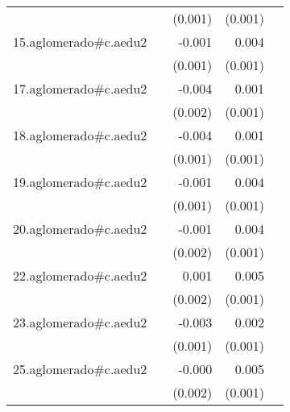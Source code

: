 {\begin{longtable}{l*{4}{D{.}{.}{-1}}}
            &                     &     (0.001)         &     (0.001)         &                     \\
\addlinespace
15.aglomerado#c.aedu2&                     &      -0.001         &       0.004\sym{***}&                     \\
            &                     &     (0.001)         &     (0.001)         &                     \\
\addlinespace
17.aglomerado#c.aedu2&                     &      -0.004\sym{**} &       0.001         &                     \\
            &                     &     (0.002)         &     (0.001)         &                     \\
\addlinespace
18.aglomerado#c.aedu2&                     &      -0.004\sym{**} &       0.001         &                     \\
            &                     &     (0.001)         &     (0.001)         &                     \\
\addlinespace
19.aglomerado#c.aedu2&                     &      -0.001         &       0.004\sym{***}&                     \\
            &                     &     (0.001)         &     (0.001)         &                     \\
\addlinespace
20.aglomerado#c.aedu2&                     &      -0.001         &       0.004\sym{**} &                     \\
            &                     &     (0.002)         &     (0.001)         &                     \\
\addlinespace
22.aglomerado#c.aedu2&                     &       0.001         &       0.005\sym{***}&                     \\
            &                     &     (0.002)         &     (0.001)         &                     \\
\addlinespace
23.aglomerado#c.aedu2&                     &      -0.003\sym{*}  &       0.002\sym{*}  &                     \\
            &                     &     (0.001)         &     (0.001)         &                     \\
\addlinespace
25.aglomerado#c.aedu2&                     &      -0.000         &       0.005\sym{***}&                     \\
            &                     &     (0.002)         &     (0.001)         &                     \\

\end{longtable}}
